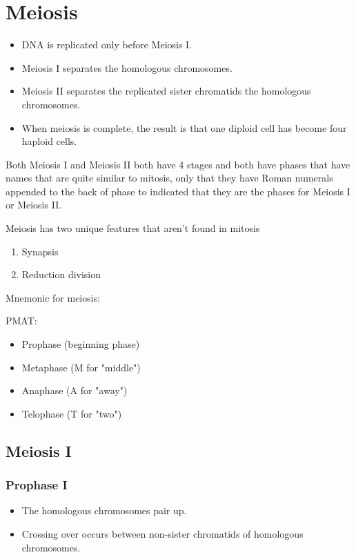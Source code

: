 \documentclass[11pt]{article}
\begin{document}
\newpage
\section{Meiosis}
\label{sec:org3cc9e20}
\begin{itemize}
\item DNA is replicated only before Meiosis I.
\item Meiosis I separates the homologous chromosomes.
\item Meiosis II separates the replicated sister chromatids the homologous chromosomes.
\item When meiosis is complete, the result is that one diploid cell has become four haploid cells.
\end{itemize}

Both Meiosis I and Meiosis II both have 4 stages and both have phases that have names that are quite similar to mitosis, only that they have Roman numerals appended to the back of phase to indicated that they are the phases for Meiosis I or Meiosis II.


Meiosis has two unique features that aren't found in mitosis
\begin{enumerate}
\item Synapsis
\item Reduction division
\end{enumerate}

Mnemonic for meiosis:


PMAT:
\begin{itemize}
\item Prophase (beginning phase)
\item Metaphase (M for "middle")
\item Anaphase (A for "away")
\item Telophase (T for "two")
\end{itemize}

\newpage
\subsection{Meiosis I}
\label{sec:org61cf3ef}

\subsubsection{Prophase I}
\label{sec:org623161e}
\begin{itemize}
\item The homologous chromosomes pair up.
\item Crossing over occurs between non-sister chromatids of homologous chromosomes.
\end{itemize}
\end{document}
